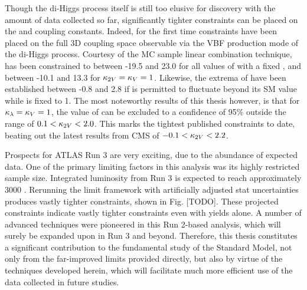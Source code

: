 Though the di-Higgs process itself is still too elusive for discovery with the amount of data collected so far,
    significantly tighter constraints can be placed on the \kvv and \kl coupling constants.
Indeed, for the first time constraints have been placed on the full
    3D coupling space observable via the VBF production mode of the di-Higgs process.
Courtesy of the MC sample linear combination technique,
    \kl has been constrained to between -19.5 and 23.0 for all values of \kvv with a fixed ,
    and between -10.1 and 13.3 for $\kappa_{2V}=\kappa_{V}=1$.
Likewise, the extrema of \kvv have been established between -0.8 and 2.8
    if \kl is permitted to fluctuate beyond its SM value while \kv is fixed to 1.
The most noteworthy results of this thesis however, is that for $\kappa_{\lambda}=\kappa_{V}=1$,
    the value of \kvv can be excluded to a confidence of 95\% outside the range of $0.1 < \kappa_{2V} < 2.0$.
This marks the tightest published constraints to date, beating out the latest results from CMS
    of $-0.1 < \kappa_{2V} < 2.2$\cite{cms_results}.

Prospects for ATLAS Run 3 are very exciting, due to the abundance of expected data.
One of the primary limiting factors in this analysis was its highly restricted sample size.
Integrated luminosity from Run 3 is expected to reach approximately 3000 \ifb.
Rerunning the limit framework with artificially adjusted stat uncertainties produces vastly tighter constraints,
    shown in Fig. [TODO].
These projected constraints indicate vastly tighter constraints even with yields alone.
A number of advanced techniques were pioneered in this Run 2-based analysis,
    which will surely be expanded upon in Run 3 and beyond.
Therefore, this thesis constitutes a significant contribution to the fundamental study of the Standard Model,
    not only from the far-improved limits provided directly,
    but also by virtue of the techniques developed herein,
    which will facilitate much more efficient use of the data collected in future studies.



